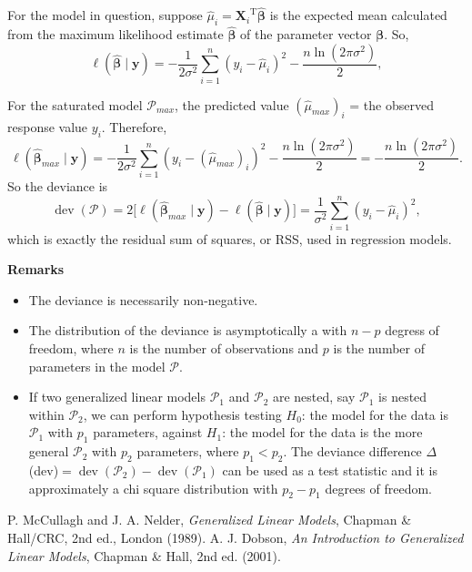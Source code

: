 \documentclass[12pt]{article}
\begin{document}
For the model in question, suppose $\hat{\mu}_i={\textbf{X}_i}^{\operatorname{T}}\hat{\boldsymbol{\beta}}$ is the expected mean calculated from the maximum likelihood estimate $\hat{\boldsymbol{\beta}}$ of the parameter vector $\boldsymbol{\beta}$.  So,
$$\ell(\hat{\boldsymbol{\beta}}\mid\textbf{y})=-\frac{1}{2\sigma^2}\sum_{i=1}^{n}(y_i-\hat{\mu}_i)^2-\frac{n\operatorname{ln}(2\pi\sigma^2)}{2},$$

For the saturated model $\mathcal{P}_{max}$, the predicted value $(\hat{\mu}_{max})_i$ = the observed response value $y_i$.  Therefore,
$$\ell(\hat{\boldsymbol{\beta}}_{max}\mid\textbf{y})=-\frac{1}{2\sigma^2}\sum_{i=1}^{n}(y_i-(\hat{\mu}_{max})_i)^2-\frac{n\operatorname{ln}(2\pi\sigma^2)}{2}=-\frac{n\operatorname{ln}(2\pi\sigma^2)}{2}.$$
So the deviance is 
$$\operatorname{dev}(\mathcal{P})=2\big[\ell(\hat{\boldsymbol{\beta}}_{max}\mid\textbf{y})-\ell(\hat{\boldsymbol{\beta}}\mid\textbf{y})\big]=\frac{1}{\sigma^2}\sum_{i=1}^{n}(y_i-\hat{\mu}_i)^2,$$
which is exactly the residual sum of squares, or RSS, used in regression models.

\textbf{Remarks}
\begin{itemize}
\item The deviance is necessarily non-negative.
\item The distribution of the deviance is asymptotically a  with $n-p$ degress of freedom, where $n$ is the number of observations and $p$ is the number of parameters in the model $\mathcal{P}$.
\item If two generalized linear models $\mathcal{P}_1$ and $\mathcal{P}_2$ are nested, say $\mathcal{P}_1$ is nested within $\mathcal{P}_2$, we can perform hypothesis testing $H_0$: the model for the data is $\mathcal{P}_1$ with $p_1$ parameters, against $H_1$: the model for the data is the more general $\mathcal{P}_2$ with $p_2$ parameters, where $p_1<p_2$.  The deviance difference $\Delta$(dev)$=\operatorname{dev}(\mathcal{P}_2)-\operatorname{dev}(\mathcal{P}_1)$ can be used as a test statistic and it is approximately a chi square distribution with $p_2-p_1$ degrees of freedom.
\end{itemize}
\par
\begin{thebibliography}{8}
 P. McCullagh and J. A. Nelder, {\em Generalized Linear Models}, Chapman \& Hall/CRC, 2nd ed., London (1989).
 A. J. Dobson, {\em An Introduction to Generalized Linear Models}, Chapman \& Hall, 2nd ed. (2001).
\end{thebibliography}
\end{document}
